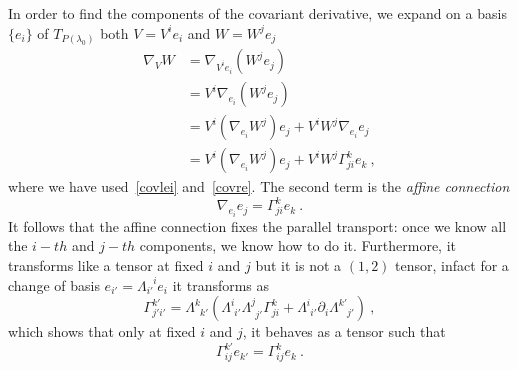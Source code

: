     In order to find the components of the covariant derivative, we expand on a basis $\{e_i\}$ of $T_{P(\lambda_0)}$ both $V = V^i e_i$ and $W = W^j e_j$
    \begin{equation}\label{covder1}
    \begin{aligned}
        \nabla_V W & = \nabla_{V^i e_i} (W^j e_j) \\ & = V^i \nabla_{e_i} (W^j e_j) \\ & = V^i (\nabla_{e_i} W^j) e_j + V^i W^j \nabla_{e_i} e_j \\ & = V^i (\nabla_{e_i} W^j) e_j + V^i W^j \Gamma^k_{ji} e_k ~,
    \end{aligned}
    \end{equation}
    where we have used~\eqref{covlei} and~\eqref{covre}. The second term is the \textit{affine connection}
    \begin{equation}\label{affconn}
        \nabla_{e_i} e_j = \Gamma^k_{ji} e_k ~.
    \end{equation} 
    It follows that the affine connection fixes the parallel transport: once we know all the $i-th$ and $j-th$ components, we know how to do it. Furthermore, it transforms like a tensor at fixed $i$ and $j$ but it is not a $(1,2)$ tensor, infact for a change of basis $e_{i'} = \Lambda_{i'}^{\phantom{i'} i} e_i$ it transforms as 
    \begin{equation*}
        \Gamma^{k'}_{j'i'} = \Lambda^{k}_{\phantom{k} k'}(\Lambda^{i}_{\phantom{i} i'} \Lambda^{j}_{\phantom{j} j'} \Gamma^k_{ji} + \Lambda^{i}_{\phantom{i} i'} \partial_i \Lambda^{k'}_{\phantom{k'} j'} ) ~,
    \end{equation*}
    which shows that only at fixed $i$ and $j$, it behaves as a tensor such that 
    \begin{equation*}
        \Gamma^{k'}_{ij} e_{k'} = \Gamma^k_{ij} e_k ~.
    \end{equation*}
